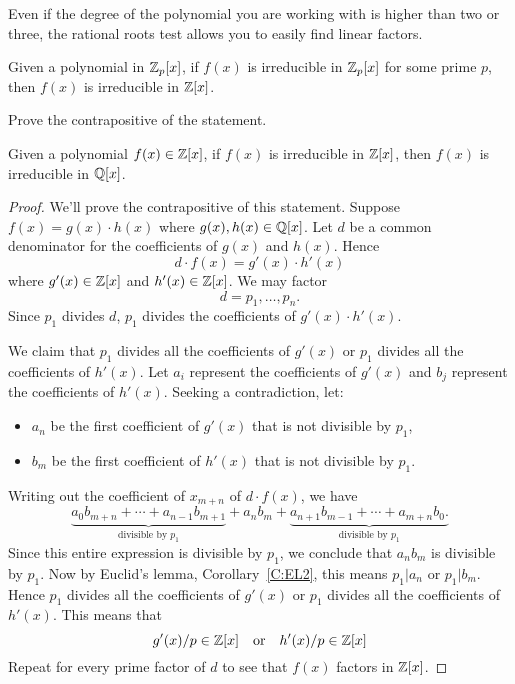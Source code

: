 \documentclass{ximera}
\begin{document}
Even if the degree of the polynomial you are working with is higher
than two or three, the rational roots test allows you to easily find
linear factors.


\begin{lemma}\label{L:RCP}
  Given a polynomial in $\mathbb Z_p[x]$, if $f(x)$ is irreducible in
  $\mathbb Z_p[x]$ for some prime $p$, then $f(x)$ is irreducible in $\mathbb Z[x]$.
  \begin{sketch}
    Prove the contrapositive of the statement.
  \end{sketch}
\end{lemma}


\begin{lemma}\label{L:G}
  Given a polynomial $f(x)\in\mathbb Z[x]$, if $f(x)$ is irreducible in
  $\mathbb Z[x]$, then $f(x)$ is irreducible in $\mathbb Q[x]$.
  \begin{proof}
    We'll prove the contrapositive of this statement. Suppose $f(x) =
    g(x)\cdot h(x)$ where $g(x),h(x)\in\mathbb Q[x]$. Let $d$ be a common
    denominator for the coefficients of $g(x)$ and $h(x)$. Hence
    \[
    d\cdot f(x) = g'(x)\cdot h'(x)
    \]
    where $g'(x)\in \mathbb Z[x]$ and $h'(x) \in\mathbb Z[x]$. We may factor
    \[
    d = p_1,\dots, p_n.
    \]
    Since $p_1$ divides $d$, $p_1$ divides the coefficients of
    $g'(x)\cdot h'(x)$.


    We claim that $p_1$ divides all the coefficients of $g'(x)$ or
    $p_1$ divides all the coefficients of $h'(x)$.  Let $a_i$
    represent the coefficients of $g'(x)$ and $b_j$ represent the
    coefficients of $h'(x)$. Seeking a contradiction, let:
    \begin{itemize}
      \item $a_n$ be the first coefficient of $g'(x)$ that is not
        divisible by $p_1$,
      \item $b_m$ be the first coefficient of $h'(x)$ that is not
        divisible by $p_1$.
    \end{itemize}
    Writing out the coefficient of $x_{m+n}$ of $d\cdot f(x)$, we have
    \[
    \underbrace{a_0b_{m+n}  + \cdots + a_{n-1}b_{m+1}}_{\text{divisible by $p_1$}} + a_nb_m + \underbrace{a_{n+1}b_{m-1} + \cdots + a_{m+n} b_0.}_{\text{divisible by $p_1$}}
    \]
    Since this entire expression is divisible by $p_1$, we conclude
    that $a_nb_m$ is divisible by $p_1$. Now by Euclid's lemma,
    Corollary~\ref{C:EL2}, this means $p_1|a_n$ or $p_1|b_m$. Hence $p_1$
    divides all the coefficients of $g'(x)$ or $p_1$ divides all the
    coefficients of $h'(x)$. This means that
    \[
    g'(x)/p \in \mathbb Z[x] \quad\text{or}\quad h'(x)/p \in \mathbb Z[x]
    \]
    Repeat for every prime factor of $d$ to see that $f(x)$ factors in
    $\mathbb Z[x]$.
  \end{proof}
\end{lemma}
\end{document}
